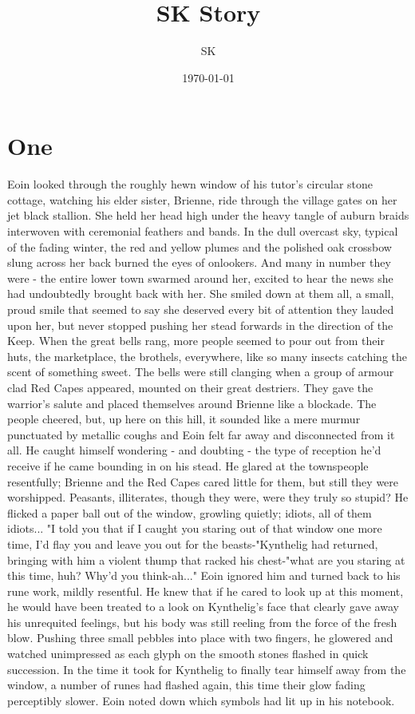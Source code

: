 \documentclass[twoside]{article}
\title{SK Story}
\author{SK}
\date{\today}
\begin{document}

\section{One}

Eoin looked through the roughly hewn window of his tutor's circular stone cottage, watching his elder sister, Brienne, ride through the village gates on her jet black stallion. She held her head high under the heavy tangle of auburn braids interwoven with ceremonial feathers and bands. In the dull overcast sky, typical of the fading winter, the red and yellow plumes and the polished oak crossbow slung across her back burned the eyes of onlookers. And many in number they were - the entire lower town swarmed around her, excited to hear the news she had undoubtedly brought back with her. She smiled down at them all, a small, proud smile that seemed to say she deserved every bit of attention they lauded upon her, but never stopped pushing her stead forwards in the direction of the Keep. When the great bells rang, more people seemed to pour out from their huts, the marketplace, the brothels, everywhere, like so many insects catching the scent of something sweet.
The bells were still clanging when a group of armour clad Red Capes appeared, mounted on their great destriers. They gave the warrior's salute and placed themselves around Brienne like a blockade. The people cheered, but, up here on this hill,  it sounded like a mere murmur punctuated by metallic coughs and Eoin felt far away and disconnected from it all. He caught himself wondering  - and doubting - the type of reception he'd receive if he came bounding in on his stead. He glared at the townspeople resentfully; Brienne and the Red Capes cared little for them, but still they were worshipped. Peasants, illiterates, though they were, were they truly so stupid? He flicked a paper ball out of the window, growling quietly; idiots, all of them idiots...
"I told you that if I caught you staring out of that window one more time, I'd flay you and leave you out for the beasts-"Kynthelig had returned, bringing with him a violent thump that racked his chest-"what are you staring at this time, huh? Why'd you think-ah..."
Eoin ignored him and turned back to his rune work, mildly resentful. He knew that if he cared to look up at this moment, he would have been treated to a look on Kynthelig's face that clearly gave away his unrequited feelings, but his body was still reeling from the force of the fresh blow. Pushing three small pebbles into place with two fingers, he glowered and watched unimpressed as each glyph on the smooth stones flashed in quick succession. In the time it took for Kynthelig to finally tear himself away from the window, a number of runes had flashed again, this time their glow fading perceptibly slower. Eoin noted down which symbols had lit up in his notebook.
\end{document}

